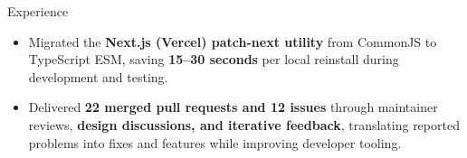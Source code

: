 \documentclass{resume}
\begin{document}
\begin{experienceSection}{Experience}
    \experienceItem[
        company={\textbf{Open Source} | Remote | Software Contributor},
        location={},
        position={},
        duration={July 2025 - May 2026}
    ]

    \begin{itemize}
        \itemsep -6pt {}

        \item Migrated the \textbf{Next.js (Vercel) patch-next utility} from CommonJS to TypeScript ESM, saving \textbf{15--30 seconds} per local reinstall during development and testing.

        \item Delivered \textbf{22 merged pull requests and 12 issues} through maintainer reviews, \textbf{design discussions, and iterative feedback}, translating reported problems into fixes and features while improving developer tooling.

    \end{itemize}

\end{experienceSection}
\end{document}
